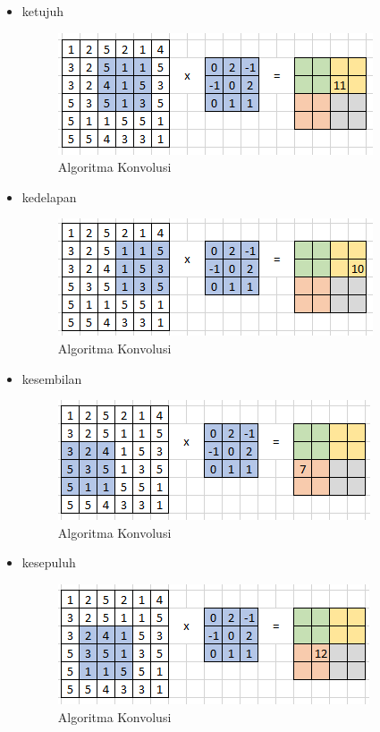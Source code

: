 \begin{itemize}
\begin{itemize}
		\item ketujuh
			\begin{figure}[H]
				\centering
				\includegraphics[scale=1]{figures/1174083/figures7/17.png}
				\caption{Algoritma Konvolusi}
			\end{figure}

		\item kedelapan
			\begin{figure}[H]
				\centering
				\includegraphics[scale=1]{figures/1174083/figures7/18.png}
				\caption{Algoritma Konvolusi}
			\end{figure}

		\item kesembilan
			\begin{figure}[H]
				\centering
				\includegraphics[scale=1]{figures/1174083/figures7/19.png}
				\caption{Algoritma Konvolusi}
			\end{figure}
			
		\item kesepuluh
			\begin{figure}[H]
				\centering
				\includegraphics[scale=1]{figures/1174083/figures7/20.png}
				\caption{Algoritma Konvolusi}
			\end{figure}
			

\end{itemize}
\end{itemize}
